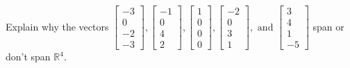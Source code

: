 \documentclass{article}
\begin{document}
\begin{exerciseStatement}
    Explain why the vectors \(\left[\begin{array}{r}
-3 \\
0 \\
-2 \\
-3
\end{array}\right] , \left[\begin{array}{r}
-1 \\
0 \\
4 \\
2
\end{array}\right] , \left[\begin{array}{r}
1 \\
0 \\
0 \\
0
\end{array}\right] , \left[\begin{array}{r}
-2 \\
0 \\
3 \\
1
\end{array}\right] , \text{ and } \left[\begin{array}{r}
3 \\
4 \\
1 \\
-5
\end{array}\right]\) span or don't span \(\mathbb{R}^4\).



  
\end{exerciseStatement}
\end{document}
